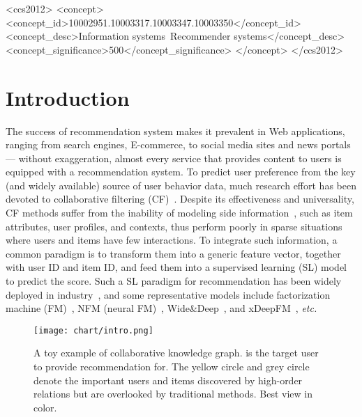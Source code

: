 \documentclass[sigconf]{acmart}
\newcommand{\etc}{\emph{etc.}}
\theoremstyle{definition}
\begin{document}
\begin{CCSXML}
	<ccs2012>
	<concept>
	<concept_id>10002951.10003317.10003347.10003350</concept_id>
	<concept_desc>Information systems~Recommender systems</concept_desc> <concept_significance>500</concept_significance>
	</concept>
	</ccs2012>
\end{CCSXML}

\maketitle

\section{Introduction}
The success of recommendation system makes it prevalent in Web applications, ranging from search engines, E-commerce, to social media sites and news portals --- without exaggeration, almost every service that provides content to users is equipped with a recommendation system. 
To predict user preference from the key (and widely available) source of user behavior data, much research effort has been devoted to collaborative filtering (CF)~\cite{NAIS,NCF,NGCF}. Despite its effectiveness and universality, CF methods suffer from the inability of modeling side information~\cite{NSCR,TEM}, such as item attributes, user profiles, and contexts, thus perform poorly in sparse situations where users and items have few interactions. 
To integrate such information, a common paradigm is to transform them into a generic feature vector, together with user ID and item ID, and feed them into a supervised learning (SL) model to predict the score. Such a SL paradigm for recommendation has been widely deployed 
in industry~\cite{DIN,DeepCrossing,WideDeep}, and some representative models include factorization machine (FM)~\cite{FM}, NFM (neural FM)~\cite{NFM}, Wide\&Deep~\cite{WideDeep}, and xDeepFM~\cite{xDeepFM}, \etc 

\begin{figure}[t]
    \centering
	\texttt{[image: chart/intro.png]}
	\vspace{-10pt}
	\caption{A toy example of collaborative knowledge graph.  is the target user to provide recommendation for. The yellow circle and grey circle denote the important users and items discovered by high-order relations but are overlooked by traditional methods. Best view in color.
}
	\label{fig:intro}
	\vspace{-15pt}
\end{figure}
\end{document}
